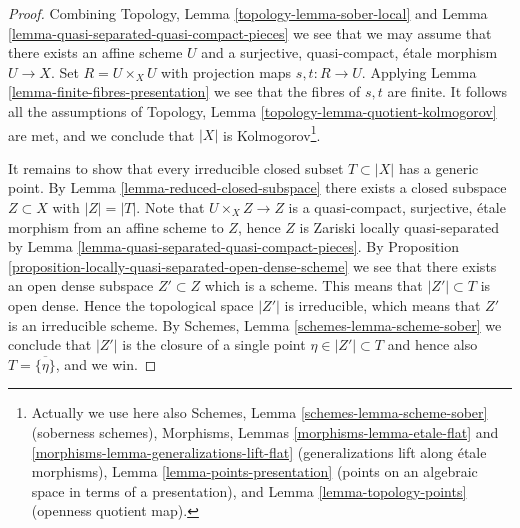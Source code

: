 \documentclass[10pt,a4paper]{amsart}
\theoremstyle{plain}
\theoremstyle{definition}
\theoremstyle{remark}
\numberwithin{equation}{subsection}
\begin{document}
\begin{proof}
Combining
Topology, Lemma \ref{topology-lemma-sober-local}
and
Lemma \ref{lemma-quasi-separated-quasi-compact-pieces}
we see that we may assume that there exists an affine scheme $U$
and a surjective, quasi-compact, \'etale morphism $U \to X$.
Set $R = U \times_X U$ with projection maps $s, t : R \to U$. Applying
Lemma \ref{lemma-finite-fibres-presentation}
we see that the fibres of $s, t$ are finite. It follows all the assumptions of
Topology, Lemma \ref{topology-lemma-quotient-kolmogorov}
are met, and we conclude that $|X|$ is Kolmogorov\footnote{
Actually we use here also
Schemes, Lemma \ref{schemes-lemma-scheme-sober} (soberness schemes),
Morphisms, Lemmas \ref{morphisms-lemma-etale-flat}
and \ref{morphisms-lemma-generalizations-lift-flat} (generalizations
lift along \'etale morphisms),
Lemma \ref{lemma-points-presentation} (points on an algebraic space in
terms of a presentation), and
Lemma \ref{lemma-topology-points} (openness quotient map).}.

\medskip\noindent
It remains to show that every irreducible closed subset
$T \subset |X|$ has a generic point. By
Lemma \ref{lemma-reduced-closed-subspace}
there exists a closed subspace $Z \subset X$ with $|Z| = |T|$.
Note that $U \times_X Z \to Z$ is a quasi-compact, surjective, \'etale
morphism from an affine scheme to $Z$, hence $Z$ is Zariski locally
quasi-separated by
Lemma \ref{lemma-quasi-separated-quasi-compact-pieces}.
By
Proposition \ref{proposition-locally-quasi-separated-open-dense-scheme}
we see that there exists an open dense subspace $Z' \subset Z$
which is a scheme. This means that $|Z'| \subset T$ is open dense.
Hence the topological space $|Z'|$ is irreducible, which means that
$Z'$ is an irreducible scheme. By
Schemes, Lemma \ref{schemes-lemma-scheme-sober}
we conclude that $|Z'|$ is the closure of a single point
$\eta \in |Z'| \subset T$ and hence also $T = \overline{\{\eta\}}$, and we win.
\end{proof}
\end{document}
